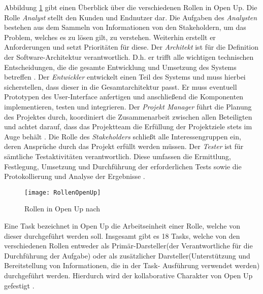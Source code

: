 Abbildung \ref{fig:RollenOpenUp} gibt einen Überblick über die verschiedenen Rollen in Open Up. Die Rolle \textit{Analyst} stellt den Kunden und Endnutzer dar. Die Aufgaben des \textit{Analysten} bestehen aus dem Sammeln von Informationen von den Stakeholdern, um das Problem, welches es zu lösen gilt, zu verstehen. Weiterhin erstellt er Anforderungen und setzt Prioritäten für diese.\newline
Der \textit{Architekt} ist für die Definition der Software-Architektur verantwortlich. D.h. er trifft alle wichtigen technischen Entscheidungen, die die gesamte Entwicklung und Umsetzung des Systems betreffen \cite{OpenUPProcess}.\newline
Der \textit{Entwickler} entwickelt einen Teil des Systems und muss hierbei sicherstellen, dass dieser in die Gesamtarchitektur passt. Er muss eventuell Prototypen des User-Interface anfertigen und anschließend die Komponenten implementieren, testen und integrieren.\newline
Der \textit{Projekt Manager} führt die Planung des Projektes durch, koordiniert die Zusammenarbeit zwischen allen Beteiligten und achtet darauf, dass das Projektteam die Erfüllung der Projektziele stets im Auge behält \cite{OpenUPProcess}.\newline
Die Rolle des \textit{Stakeholders} schließt alle Interessengruppen ein, deren Ansprüche durch das Projekt erfüllt werden müssen. \newline
Der \textit{Tester} ist für sämtliche Testaktivitäten verantwortlich. Diese umfassen die Ermittlung, Festlegung, Umsetzung und Durchführung der erforderlichen Tests sowie die Protokollierung und Analyse der Ergebnisse \cite{OpenUPProcess}.
\begin{figure}[htp]
\begin{center}
  \texttt{[image: RollenOpenUp]} %
  \caption{Rollen in Open Up nach \cite{openup}}
  \label{fig:RollenOpenUp}
\end{center}
\end{figure}

Eine Task bezeichnet in Open Up die Arbeitseinheit einer Rolle, welche von dieser durchgeführt werden soll. Insgesamt gibt es 18 Tasks, welche von den verschiedenen Rollen entweder als Primär-Darsteller(der Verantwortliche für die Durchführung der Aufgabe) oder als zusätzlicher Darsteller(Unterstützung und Bereitstellung von Informationen, die in der Task- Ausführung verwendet werden) durchgeführt werden. Hierdurch wird der kollaborative Charakter von Open Up gefestigt \cite{eclipseopenup}.

